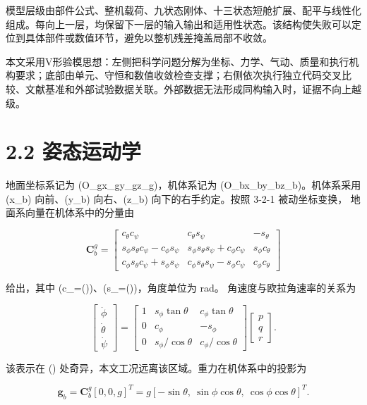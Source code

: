 \documentclass[UTF8,11pt,oneside,openany,fontset=windows]{ctexbook}
\begin{document}
模型层级由部件公式、整机载荷、九状态刚体、十三状态短舱扩展、配平与线性化组成。每向上一层，均保留下一层的输入输出和适用性状态。该结构使失败可以定位到具体部件或数值环节，避免以整机残差掩盖局部不收敛。

本文采用V形验模思想：左侧把科学问题分解为坐标、力学、气动、质量和执行机构要求；底部由单元、守恒和数值收敛检查支撑；右侧依次执行独立代码交叉比较、文献基准和外部试验数据关联。外部数据无法形成同构输入时，证据不向上越级。

\section{2.2 姿态运动学}\label{ux59ffux6001ux8fd0ux52a8ux5b66}

地面坐标系记为 (O\_gx\_gy\_gz\_g)，机体系记为
(O\_bx\_by\_bz\_b)。机体系采用 (x\_b) 向前、(y\_b) 向右、(z\_b)
向下的右手约定。按照 3-2-1 被动坐标变换， 地面系向量在机体系中的分量由

\[
\mathbf C_b^g=
\begin{bmatrix}
c_\theta c_\psi&c_\theta s_\psi&-s_\theta\\
s_\phi s_\theta c_\psi-c_\phi s_\psi&s_\phi s_\theta s_\psi+c_\phi c_\psi&s_\phi c_\theta\\
c_\phi s_\theta c_\psi+s_\phi s_\psi&c_\phi s_\theta s_\psi-s_\phi c_\psi&c_\phi c_\theta
\end{bmatrix}
\]

给出，其中
(c\_\bullet=\cos(\bullet))、(s\_\bullet=\sin(\bullet))，角度单位为 rad。
角速度与欧拉角速率的关系为

\[
\begin{bmatrix}\dot\phi\\\dot\theta\\\dot\psi\end{bmatrix}
=
\begin{bmatrix}
1&s_\phi\tan\theta&c_\phi\tan\theta\\
0&c_\phi&-s_\phi\\
0&s_\phi/\cos\theta&c_\phi/\cos\theta
\end{bmatrix}
\begin{bmatrix}p\\q\\r\end{bmatrix}.
\]

该表示在 (\cos{})
处奇异，本文工况远离该区域。重力在机体系中的投影为

\[
\mathbf g_b=\mathbf C_b^g[0,0,g]^T
=g[-\sin\theta,\ \sin\phi\cos\theta,\ \cos\phi\cos\theta]^T.
\]
\end{document}
